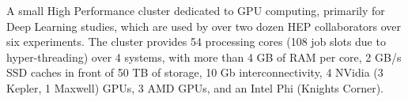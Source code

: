 A small High Performance cluster dedicated to                                                                                                              
GPU computing, primarily for Deep Learning studies, which are used by
over two dozen HEP collaborators over six experiments. The cluster
provides 54 processing cores (108 job slots due to hyper-threading) 
over 4 systems, with more than 4 GB of RAM per core, 2 GB/s SSD caches
in front of 50 TB of storage, 10 Gb interconnectivity, 4 NVidia (3 
Kepler, 1 Maxwell) GPUs, 3 AMD GPUs, and an Intel Phi (Knights
Corner).





